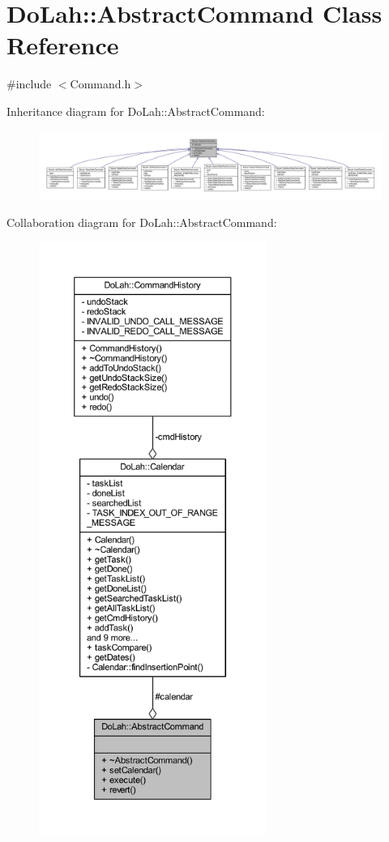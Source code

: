 \hypertarget{class_do_lah_1_1_abstract_command}{}\section{Do\+Lah\+:\+:Abstract\+Command Class Reference}
\label{class_do_lah_1_1_abstract_command}


{\ttfamily \#include $<$Command.\+h$>$}



Inheritance diagram for Do\+Lah\+:\+:Abstract\+Command\+:\nopagebreak
\begin{figure}[H]
\begin{center}
\leavevmode
\includegraphics[width=350pt]{class_do_lah_1_1_abstract_command__inherit__graph}
\end{center}
\end{figure}


Collaboration diagram for Do\+Lah\+:\+:Abstract\+Command\+:\nopagebreak
\begin{figure}[H]
\begin{center}
\leavevmode
\includegraphics[height=550pt]{class_do_lah_1_1_abstract_command__coll__graph}
\end{center}
\end{figure}
